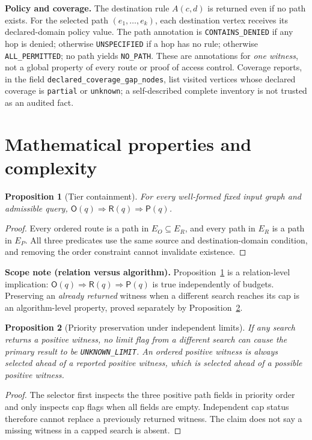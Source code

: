 \documentclass[11pt,letterpaper]{article}
\newtheorem{proposition}{Proposition}
\newcommand{\code}[1]{\texttt{#1}}
\newcommand{\OO}{\mathsf{O}}
\newcommand{\RR}{\mathsf{R}}
\newcommand{\PP}{\mathsf{P}}
\begin{document}
\textbf{Policy and coverage.} The destination rule \(A(c,d)\) is returned even if no path exists. For the selected path \((e_1,\ldots,e_k)\), each destination vertex receives its declared-domain policy value. The path annotation is \code{CONTAINS\_DENIED} if any hop is denied; otherwise \code{UNSPECIFIED} if a hop has no rule; otherwise \code{ALL\_PERMITTED}; no path yields \code{NO\_PATH}. These are annotations for \emph{one witness}, not a global property of every route or proof of access control. Coverage reports, in the field \code{declared\_coverage\_gap\_nodes}, list visited vertices whose declared coverage is \code{partial} or \code{unknown}; a self-described complete inventory is not trusted as an audited fact.

\FloatBarrier
\section{Mathematical properties and complexity}
\begin{proposition}[Tier containment]\label{prop:containment}
For every well-formed fixed input graph and admissible query, \(\OO(q)\Rightarrow\RR(q)\Rightarrow\PP(q)\).
\end{proposition}
\begin{proof}
Every ordered route is a path in \(E_O\subseteq E_R\), and every path in \(E_R\) is a path in \(E_P\). All three predicates use the same source and destination-domain condition, and removing the order constraint cannot invalidate existence.
\end{proof}

\noindent\textbf{Scope note (relation versus algorithm).}
Proposition~\ref{prop:containment} is a relation-level implication: \(\OO(q)\Rightarrow\RR(q)
\Rightarrow\PP(q)\) is true independently of budgets. Preserving an
\emph{already returned} witness when a different search reaches
its cap is an algorithm-level property, proved separately by Proposition~\ref{prop:priority}.

\begin{proposition}[Priority preservation under independent limits]\label{prop:priority}
If any search returns a positive witness, no limit flag from a different search can cause the primary result to be \code{UNKNOWN\_LIMIT}. An ordered positive witness is always selected ahead of a reported positive witness, which is selected ahead of a possible positive witness.
\end{proposition}
\begin{proof}
The selector first inspects the three positive path fields in priority order and only inspects cap flags when all fields are empty. Independent cap status therefore cannot replace a previously returned witness. The claim does not say a missing witness in a capped search is absent.
\end{proof}
\end{document}
